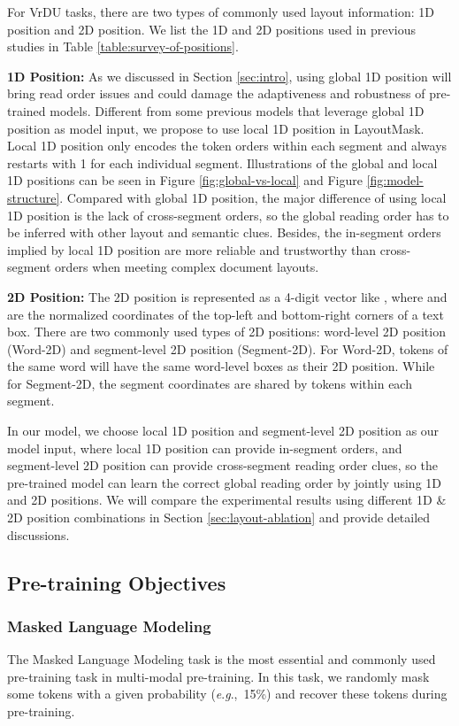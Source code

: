\documentclass[11pt]{article}
\newcommand{\eg}{\textit{e}.\textit{g}.,\ }
\begin{document}
For VrDU tasks, there are two types of commonly used layout information: 1D position and 2D position. 
We list the 1D and 2D positions used in previous studies in Table \ref{table:survey-of-positions}.

\textbf{1D Position:}
As we discussed in Section \ref{sec:intro}, using global 1D position will bring read order issues and could damage the adaptiveness and robustness of pre-trained models.
Different from some previous models that leverage global 1D position as model input, we propose to use local 1D position in LayoutMask.
Local 1D position only encodes the token orders within each segment and always restarts with 1 for each individual segment.
 Illustrations of the global and local 1D positions can be seen in Figure \ref{fig:global-vs-local} and Figure \ref{fig:model-structure}. 
 Compared with global 1D position, the major difference of using local 1D position is the lack of cross-segment orders, so the global reading order has to be inferred with other layout and semantic clues. Besides, the in-segment orders implied by local 1D position are more reliable and trustworthy than cross-segment orders when meeting complex document layouts.


 \textbf{2D Position:}
The 2D position is represented as a 4-digit vector like , where  and  are the normalized coordinates of the top-left and bottom-right corners of a text box.
There are two commonly used types of 2D positions: word-level 2D position (Word-2D) and segment-level 2D position (Segment-2D). 
For Word-2D, tokens of the same word will have the same word-level boxes as their 2D position. While for Segment-2D, the segment coordinates are shared by tokens within each segment.   

In our model, we choose local 1D position and segment-level 2D position as our model input, where local 1D position can provide in-segment orders, and segment-level 2D position can provide cross-segment reading order clues, so the pre-trained model can learn the correct global reading order by jointly using 1D and 2D positions.  
We will compare the experimental results using different 1D \& 2D position combinations in Section \ref{sec:layout-ablation} and provide detailed discussions. 

\subsection{Pre-training Objectives}
\label{sec:pretrain-tasks}
\subsubsection{Masked Language Modeling}
\label{sec:mlm}
The Masked Language Modeling task is the most essential and commonly used pre-training task in multi-modal pre-training.
In this task, we randomly mask some tokens with a given probability  (\eg 15\%) and recover these tokens during pre-training.
\end{document}
